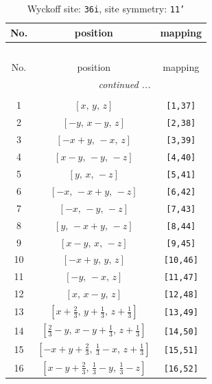 \documentclass[fleqn,8pt]{jsarticle}
\begin{document}
\renewcommand{\arraystretch}{1.2}
\begin{longtable}{ccc}
\caption{Wyckoff site: {\tt 36i}, site symmetry: {\tt 11'}}
 \\
 \hline \hline
No. & position & mapping \\ \hline \endfirsthead

\multicolumn{2}{l}{\tablename\ \thetable{}} \\
 \hline \hline
No. & position & mapping \\ \hline \endhead

 \hline \hline
\multicolumn{2}{r}{\footnotesize\it continued ...} \\ \endfoot

 \hline \hline
\multicolumn{2}{r}{} \\ \endlastfoot

1 & $\left[ x,\, y,\, z \right]$ & {\tt [1,37]} \\ \hline
2 & $\left[ - y,\, x - y,\, z \right]$ & {\tt [2,38]} \\ \hline
3 & $\left[ - x + y,\, - x,\, z \right]$ & {\tt [3,39]} \\ \hline
4 & $\left[ x - y,\, - y,\, - z \right]$ & {\tt [4,40]} \\ \hline
5 & $\left[ y,\, x,\, - z \right]$ & {\tt [5,41]} \\ \hline
6 & $\left[ - x,\, - x + y,\, - z \right]$ & {\tt [6,42]} \\ \hline
7 & $\left[ - x,\, - y,\, - z \right]$ & {\tt [7,43]} \\ \hline
8 & $\left[ y,\, - x + y,\, - z \right]$ & {\tt [8,44]} \\ \hline
9 & $\left[ x - y,\, x,\, - z \right]$ & {\tt [9,45]} \\ \hline
10 & $\left[ - x + y,\, y,\, z \right]$ & {\tt [10,46]} \\ \hline
11 & $\left[ - y,\, - x,\, z \right]$ & {\tt [11,47]} \\ \hline
12 & $\left[ x,\, x - y,\, z \right]$ & {\tt [12,48]} \\ \hline
13 & $\left[ x + \frac{2}{3},\, y + \frac{1}{3},\, z + \frac{1}{3} \right]$ & {\tt [13,49]} \\ \hline
14 & $\left[ \frac{2}{3} - y,\, x - y + \frac{1}{3},\, z + \frac{1}{3} \right]$ & {\tt [14,50]} \\ \hline
15 & $\left[ - x + y + \frac{2}{3},\, \frac{1}{3} - x,\, z + \frac{1}{3} \right]$ & {\tt [15,51]} \\ \hline
16 & $\left[ x - y + \frac{2}{3},\, \frac{1}{3} - y,\, \frac{1}{3} - z \right]$ & {\tt [16,52]} \\ \hline

\end{longtable}
\end{document}
